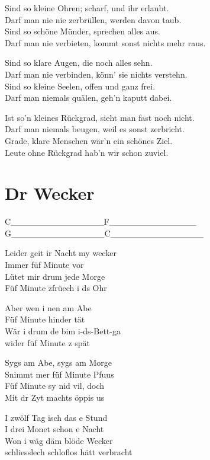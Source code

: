 \documentclass[
  letterpaper,
]{scrbook}
\begin{document}
Sind so kleine Ohren; scharf, und ihr erlaubt.\\
Darf man nie nie zerbrüllen, werden davon taub.\\
Sind so schöne Münder, sprechen alles aus.\\
Darf man nie verbieten, kommt sonst nichts mehr raus.

Sind so klare Augen, die noch alles sehn.\\
Darf man nie verbinden, könn' sie nichts verstehn.\\
Sind so kleine Seelen, offen und ganz frei.\\
Darf man niemals quälen, geh'n kaputt dabei.

Ist so'n kleines Rückgrad, sieht man fast noch nicht.\\
Darf man niemals beugen, weil es sonst zerbricht.\\
Grade, klare Menschen wär'n ein schönes Ziel.\\
Leute ohne Rückgrad hab'n wir schon zuviel.

\hypertarget{dr-wecker}{%
\chapter{Dr Wecker}\label{dr-wecker}}

\textbar C\_\_\_\_\_\_\_\textbar\_\_\_\_\_\_\_\_\textbar F\_\_\_\_\_\_\textbar\_\_\_\_\_\_\_\_\textbar{}\\
\textbar G\_\_\_\_\_\_\_\textbar\_\_\_\_\_\_\_\_\textbar C\_\_\_\_\_\_\_\textbar\_\_\_\_\_\_\_\_\textbar{}

Leider geit ir Nacht my wecker\\
Immer füf Minute vor\\
Lütet mir drum jede Morge\\
Füf Minute z\textquotesingle früech i ds Ohr

Aber wen i nen am Abe\\
Füf Minute hinder tät\\
Wär i drum de bim i-ds-Bett-ga\\
wider füf Minute z spät

Syg\textquotesingle s am Abe, syg\textquotesingle s am Morge\\
S\textquotesingle nimmt mer füf Minute Pfuus\\
Füf Minute sy nid vil, doch\\
Mit dr Zyt macht\textquotesingle s öppis us

I zwölf Tag isch das e Stund\\
I drei Monet schon e Nacht\\
Won i wäg däm blöde Wecker\\
schliesslech schloflos hätt verbracht
\end{document}
